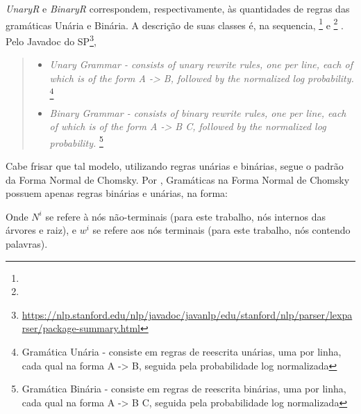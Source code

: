 \textit{UnaryR} e \textit{BinaryR} correspondem, respectivamente, às quantidades de regras das gramáticas Unária e Binária. A descrição de suas classes é, na sequencia, 
\footnote{}
e 
\footnote{}
. Pelo Javadoc do SP\footnote{\url{https://nlp.stanford.edu/nlp/javadoc/javanlp/edu/stanford/nlp/parser/lexparser/package-summary.html}},
\begin{quote}
    \begin{itemize}
        \item \textit{Unary Grammar - consists of unary rewrite rules, one per line, each of which is of the form A -> B, followed by the normalized log probability.}
        \footnote{Gramática Unária - consiste em regras de reescrita unárias, uma por linha, cada qual na forma A -> B, seguida pela probabilidade log normalizada}
        \item \textit{Binary Grammar - consists of binary rewrite rules, one per line, each of which is of the form A -> B C, followed by the normalized log probability.}
        \footnote{Gramática Binária - consiste em regras de reescrita binárias, uma por linha, cada qual na forma A -> B C, seguida pela probabilidade log normalizada}
    \end{itemize}
\end{quote}

Cabe frisar que tal modelo, utilizando regras unárias e binárias, segue o padrão da Forma Normal de Chomsky.
Por \cite[p~389]{Manning1999FoundationsNLP}, Gramáticas na Forma Normal de Chomsky possuem apenas regras binárias e unárias, na forma:
\begin{center}
    
\end{center}
Onde $N^i$ se refere à nós não-terminais (para este trabalho, nós internos das árvores e raiz), e $w^i$ se refere aos nós terminais (para este trabalho, nós contendo palavras).


